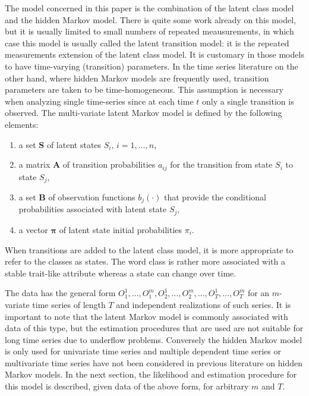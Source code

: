\documentclass[a4paper,man,nobf]{apa}
\newcommand{\vc}{\mathbf}
\newcommand{\mat}{\mathbf}
\begin{document}
The model concerned in this paper is the combination of the latent 
class model and the hidden Markov model. There is quite some work 
already on this model, but it is usually limited to small numbers of 
repeated meausurements, in which case this model is usually called 
the latent transition model: it is the repeated measurements 
extension of the latent class model. It is customary in those models 
to have time-varying (transition) parameters. In the time series 
literature on the other hand, where hidden Markov models are 
frequently used, transition parameters are taken to be 
time-homogeneous.  This assumption is necessary when analyzing single 
time-series since at each time $t$ only a single transition is 
observed. The multi-variate latent Markov model is defined by the 
following elements:
\begin{enumerate}
  	\item a set $\vc{S}$ of latent states $S_{i},\, i=1, \ldots , n$,
  	\item a matrix $\mat{A}$ of transition probabilities $a_{ij}$ for 
the transition 
	from state $S_{i}$ to state $S_{j}$,
  	\item a set $\vc{B}$ of observation functions $b_{j}(\cdot)$ that 
provide the conditional 	probabilities associated with latent state 
$S_{j}$, 
  	\item a vector $\pmb{\pi}$ of latent state initial probabilities 
$\pi_{i}$.
\end{enumerate}
When transitions are added to the latent class model, it is more 
appropriate to refer to the classes as states. The word class is 
rather more associated with a stable trait-like attribute whereas a 
state can change over time. 

The data has the general form $O_{1}^{1}, \ldots, O_{1}^{m}, 
O_{2}^{1}, \ldots, O_{2}^{m}, \ldots, O_{T}^{1}, \ldots, O_{T}^{m}$ 
for an $m$-variate time series of length $T$ and independent 
realizations of such series. It is important to note that the latent 
Markov model is commonly associated with data of this type, but the 
estimation procedures that are used are not suitable for long time 
series due to underflow problems. Conversely the hidden Markov model 
is only used for univariate time series and multiple dependent time 
series or multivariate time series have not been considered in 
previous literature on hidden Markov models. In the next section, the 
likelihood and estimation procedure for this model is described, 
given data of the above form, for arbitrary $m$ and $T$. 
\end{document}
